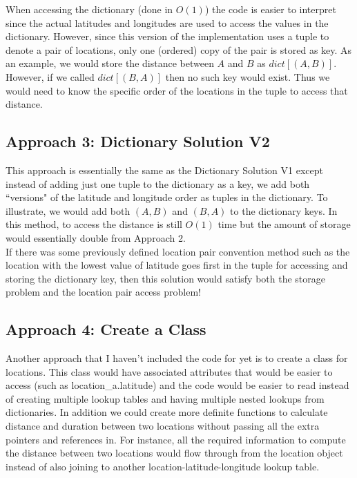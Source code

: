 \documentclass{article}
\begin{document}
When accessing the dictionary (done in $O(1)$) the code is easier to interpret since the actual latitudes and longitudes are used to access the values in the dictionary.  However, since this version of the implementation uses a tuple to denote a pair of locations, only one (ordered) copy of the pair is stored as key.  As an example, we would store the distance between $A$ and $B$ as $dict[(A,B)]$.  However, if we called $dict[(B,A)]$ then no such key would exist.  Thus we would need to know the specific order of the locations in the tuple to access that distance. 

\subsection{Approach 3: Dictionary Solution V2}
This approach is essentially the same as the Dictionary Solution V1 except instead of adding just one tuple to the dictionary as a key, we add both ``versions" of the latitude and longitude order as tuples in the dictionary.  To illustrate, we would add both $(A,B)$ and $(B,A)$ to the dictionary keys.  In this method, to access the distance is still $O(1)$ time but the amount of storage would essentially double from Approach 2.\\

If there was some previously defined location pair convention method such as the location with the lowest value of latitude goes first in the tuple for accessing and storing the dictionary key, then this solution would satisfy both the storage problem and the location pair access problem!\\

\subsection{Approach 4: Create a Class}
Another approach that I haven't included the code for yet is to create a class for locations.  This class would have associated attributes that would be easier to access (such as location\_a.latitude) and the code would be easier to read instead of creating multiple lookup tables and having multiple nested lookups from dictionaries.  In addition we could create more definite functions to calculate distance and duration between two locations without passing all the extra pointers and references in.  For instance, all the required information to compute the distance between two locations would flow through from the location object instead of also joining to another location-latitude-longitude lookup table.\\
\end{document}
